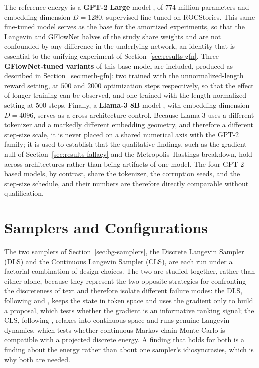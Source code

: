 The reference energy is a \textbf{GPT-2 Large} model \citep{radford2019language}, of $774$ million parameters and embedding dimension $D = 1280$, supervised fine-tuned on ROCStories. This same fine-tuned model serves as the base for the amortized experiments, so that the Langevin and GFlowNet halves of the study share weights and are not confounded by any difference in the underlying network, an identity that is essential to the unifying experiment of Section~\ref{sec:results-gfn}. Three \textbf{GFlowNet-tuned variants} of this base model are included, produced as described in Section~\ref{sec:meth-gfn}: two trained with the unnormalized-length reward setting, at $500$ and $2000$ optimization steps respectively, so that the effect of longer training can be observed, and one trained with the length-normalized setting at $500$ steps. Finally, a \textbf{Llama-3 8B} model \citep{dubey2024llama}, with embedding dimension $D = 4096$, serves as a cross-architecture control. Because Llama-3 uses a different tokenizer and a markedly different embedding geometry, and therefore a different step-size scale, it is never placed on a shared numerical axis with the GPT-2 family; it is used to establish that the qualitative findings, such as the gradient null of Section~\ref{sec:results-fallacy} and the Metropolis--Hastings breakdown, hold across architectures rather than being artifacts of one model. The four GPT-2-based models, by contrast, share the tokenizer, the corruption seeds, and the step-size schedule, and their numbers are therefore directly comparable without qualification.

\section{Samplers and Configurations}
\label{sec:meth-configs}

The two samplers of Section~\ref{sec:bg-samplers}, the Discrete Langevin Sampler (DLS) and the Continuous Langevin Sampler (CLS), are each run under a factorial combination of design choices. The two are studied together, rather than either alone, because they represent the two opposite strategies for confronting the discreteness of text and therefore isolate different failure modes: the DLS, following \citet{grathwohl2021oops} and \citet{zhang2022langevin}, keeps the state in token space and uses the gradient only to build a proposal, which tests whether the gradient is an informative ranking signal; the CLS, following \citet{kumar2022gradient}, relaxes into continuous space and runs genuine Langevin dynamics, which tests whether continuous Markov chain Monte Carlo is compatible with a projected discrete energy. A finding that holds for both is a finding about the energy rather than about one sampler's idiosyncrasies, which is why both are needed.


